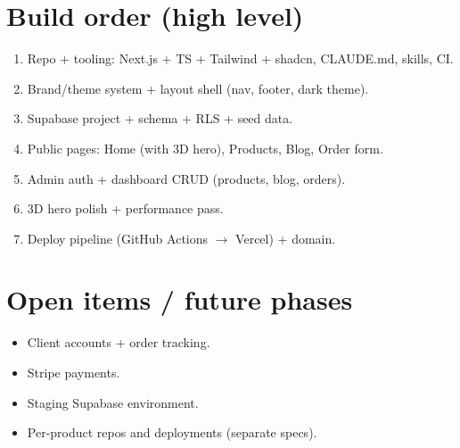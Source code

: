 \documentclass[11pt,a4paper]{article}
\begin{document}
\section{Build order (high level)}
\begin{enumerate}
  \item Repo + tooling: Next.js + TS + Tailwind + shadcn, CLAUDE.md, skills, CI.
  \item Brand/theme system + layout shell (nav, footer, dark theme).
  \item Supabase project + schema + RLS + seed data.
  \item Public pages: Home (with 3D hero), Products, Blog, Order form.
  \item Admin auth + dashboard CRUD (products, blog, orders).
  \item 3D hero polish + performance pass.
  \item Deploy pipeline (GitHub Actions $\rightarrow$ Vercel) + domain.
\end{enumerate}

\section{Open items / future phases}
\begin{itemize}
  \item Client accounts + order tracking.
  \item Stripe payments.
  \item Staging Supabase environment.
  \item Per-product repos and deployments (separate specs).
\end{itemize}
\end{document}
